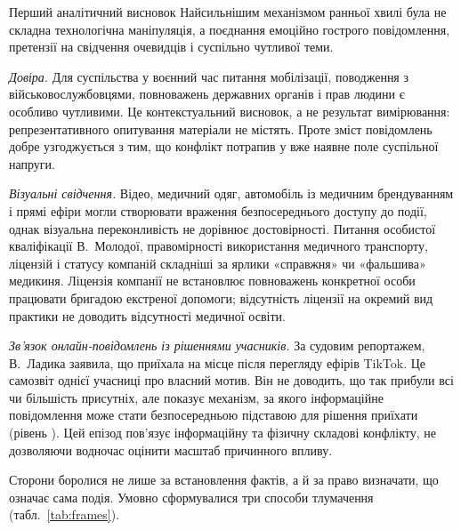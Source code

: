 \begin{keybox}{Перший аналітичний висновок}
Найсильнішим механізмом ранньої хвилі була не складна технологічна маніпуляція, а поєднання емоційно гострого повідомлення, претензії на свідчення очевидців і суспільно чутливої теми.
\end{keybox}

\emph{Довіра.} Для суспільства у воєнний час питання мобілізації, поводження з військовослужбовцями, повноважень державних органів і прав людини є особливо чутливими. Це контекстуальний висновок, а не результат вимірювання: репрезентативного опитування матеріали не містять. Проте зміст повідомлень добре узгоджується з тим, що конфлікт потрапив у вже наявне поле суспільної напруги.

\emph{Візуальні свідчення.} Відео, медичний одяг, автомобіль із медичним брендуванням і прямі ефіри могли створювати враження безпосереднього доступу до події, однак візуальна переконливість не дорівнює достовірності. Питання особистої кваліфікації В.~Молодої, правомірності використання медичного транспорту, ліцензій і статусу компаній складніші за ярлики «справжня» чи «фальшива» медикиня. Ліцензія компанії не встановлює повноважень конкретної особи працювати бригадою екстреної допомоги; відсутність ліцензії на окремий вид практики не доводить відсутності медичної освіти.

\emph{Зв'язок онлайн-повідомлень із рішеннями учасників.} За судовим репортажем, В.~Ладика заявила, що приїхала на місце після перегляду ефірів TikTok. Це самозвіт однієї учасниці про власний мотив. Він не доводить, що так прибули всі чи більшість присутніх, але показує механізм, за якого інформаційне повідомлення може стати безпосередньою підставою для рішення приїхати (рівень ). Цей епізод пов'язує інформаційну та фізичну складові конфлікту, не дозволяючи водночас оцінити масштаб причинного впливу.

Сторони боролися не лише за встановлення фактів, а й за право визначати, що означає сама подія. Умовно сформувалися три способи тлумачення (табл.~\ref{tab:frames}).


